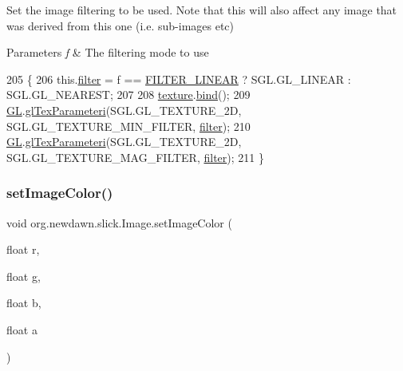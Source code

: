 Set the image filtering to be used. Note that this will also affect any image that was derived from this one (i.\+e. sub-\/images etc)


\begin{DoxyParams}{Parameters}
{\em f} & The filtering mode to use \\
\hline
\end{DoxyParams}

\begin{DoxyCode}
205                                  \{
206         this.\mbox{\hyperlink{classorg_1_1newdawn_1_1slick_1_1_image_a1c6f09687817420f3762f32bb1c3ed76}{filter}} = f == \mbox{\hyperlink{classorg_1_1newdawn_1_1slick_1_1_image_ad3ba5404a81c4fad40140cbd517fae3d}{FILTER\_LINEAR}} ? SGL.GL\_LINEAR : SGL.GL\_NEAREST;
207 
208         \mbox{\hyperlink{classorg_1_1newdawn_1_1slick_1_1_image_a9fd9ddb21247305c83ac4e37d9d51f79}{texture}}.\mbox{\hyperlink{interfaceorg_1_1newdawn_1_1slick_1_1opengl_1_1_texture_a97c02b82a8170c4c0bccb570dc872873}{bind}}();
209         \mbox{\hyperlink{classorg_1_1newdawn_1_1slick_1_1_image_aafbab31355bec79e747f477e970dcda4}{GL}}.\mbox{\hyperlink{interfaceorg_1_1newdawn_1_1slick_1_1opengl_1_1renderer_1_1_s_g_l_a99abf6a580aac95c599916a61a4933d4}{glTexParameteri}}(SGL.GL\_TEXTURE\_2D, SGL.GL\_TEXTURE\_MIN\_FILTER, 
      \mbox{\hyperlink{classorg_1_1newdawn_1_1slick_1_1_image_a1c6f09687817420f3762f32bb1c3ed76}{filter}}); 
210         \mbox{\hyperlink{classorg_1_1newdawn_1_1slick_1_1_image_aafbab31355bec79e747f477e970dcda4}{GL}}.\mbox{\hyperlink{interfaceorg_1_1newdawn_1_1slick_1_1opengl_1_1renderer_1_1_s_g_l_a99abf6a580aac95c599916a61a4933d4}{glTexParameteri}}(SGL.GL\_TEXTURE\_2D, SGL.GL\_TEXTURE\_MAG\_FILTER, 
      \mbox{\hyperlink{classorg_1_1newdawn_1_1slick_1_1_image_a1c6f09687817420f3762f32bb1c3ed76}{filter}}); 
211     \}
\end{DoxyCode}
\mbox{\label{classorg_1_1newdawn_1_1slick_1_1_image_af46e21c381a61a3b4fda007bdf51d284}} 
\subsubsection{\texorpdfstring{set\+Image\+Color()}{setImageColor()}\hspace{0.1cm}{\footnotesize\ttfamily [1/2]}}
{\footnotesize\ttfamily void org.\+newdawn.\+slick.\+Image.\+set\+Image\+Color (\begin{DoxyParamCaption}\item[{float}]{r,  }\item[{float}]{g,  }\item[{float}]{b,  }\item[{float}]{a }\end{DoxyParamCaption})\hspace{0.3cm}{\ttfamily [inline]}}

